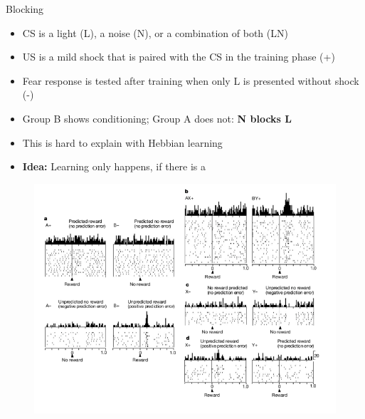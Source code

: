 \begin{frame}{Blocking}{}
	
	
	\footnotesize
	\begin{itemize}
		\item CS is a light (L), a noise (N), or a combination of both (LN)
		\item US is a mild shock that is paired with the CS in the training phase (+)
		\item Fear response is tested after training when only L is presented without shock (-)
		\item Group B shows conditioning; Group A does not: \textbf{N blocks L}
		\item This is hard to explain with Hebbian learning
		\item \textbf{Idea:} Learning only happens, if there is a 
	\end{itemize}
\end{frame}


\begin{frame}[plain]{}{}
	\begin{figure}
		\centering
		\includegraphics[scale=0.60]{10_deep_learning/02_img/dopamine_prediction_error}
	\end{figure}
\end{frame}


